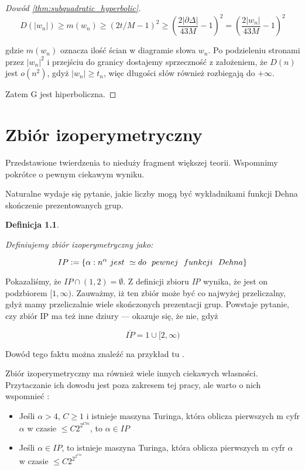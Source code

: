 \documentclass[licencjacka]{pracamgr}
\newcommand{\defeq}{\vcentcolon=}
\newtheorem{defi}{Definicja}[section]
\begin{document}
\begin{proof}[Dowód \ref{thm:subquadratic_hyperbolic}]
\[ D(|w_n|) \geq m(w_n) \geq (2t/M - 1) ^2 \geq (\frac{2 |\partial \Delta|}{43M } - 1) ^ 2  = (\frac{2 |w_n|}{43M } - 1) ^ 2 \]

gdzie $m(w_n)$ oznacza ilość ścian w diagramie słowa $w_n$. Po podzieleniu stronami przez $|w_n|^2$ i przejściu do granicy dostajemy sprzeczność z założeniem, że $D(n)$ jest $o(n^2)$, gdyż $|w_n| \geq t_n$, więc długości słów również rozbiegają do $+ \infty$.

Zatem G jest hiperboliczna.

\end{proof}

\chapter{Zbiór izoperymetryczny}

Przedstawione twierdzenia to nieduży fragment większej teorii. Wspomnimy pokrótce o pewnym ciekawym wyniku.

Naturalne wydaje się pytanie, jakie liczby mogą być wykładnikami funkcji Dehna skończenie prezentowanych grup.

\begin{defi}\label{isoperimetric set}

Definiujemy \textit{zbiór izoperymetryczny} jako:

\[ IP \defeq \{ \alpha : n^{\alpha} \ jest \  \simeq do \ \  pewnej \ \ funkcji \ \ Dehna \} \]

\end{defi}

Pokazaliśmy, że $IP \cap (1, 2) = \emptyset$. Z definicji zbioru \textit{IP} wynika, że jest on podzbiorem $[1, \infty)$. Zauważmy, iż ten zbiór może być co najwyżej przeliczalny, gdyż mamy przeliczalnie wiele skończonych prezentacji grup. Powstaje pytanie, czy zbiór IP ma też inne dziury — okazuje się, że nie, gdyż

\[ \overline{IP} = {1} \cup [2, \infty) \]


Dowód tego faktu można znaleźć na przykład tu \cite{bib:geometry_of_word_problem_fin_gen_groups}.

Zbiór izoperymetryczny ma również wiele innych ciekawych własności. Przytaczanie ich dowodu jest poza zakresem tej pracy, ale warto o nich wspomnieć \cite{bib:isoperimetric_set_turing_machines}:

\begin{itemize}

\item Jeśli $\alpha > 4$, $C \geq 1$ i istnieje maszyna Turinga, która oblicza pierwszych m cyfr  $\alpha$ w czasie $\leq C 2^{2^{Cm}}$, to $\alpha \in IP$
\item Jeśli $\alpha \in IP$, to istnieje maszyna Turinga, która oblicza pierwszych m cyfr $\alpha$ w czasie $\leq C2^{2^{2^{Cm}}}$

\end{itemize}
\end{document}
